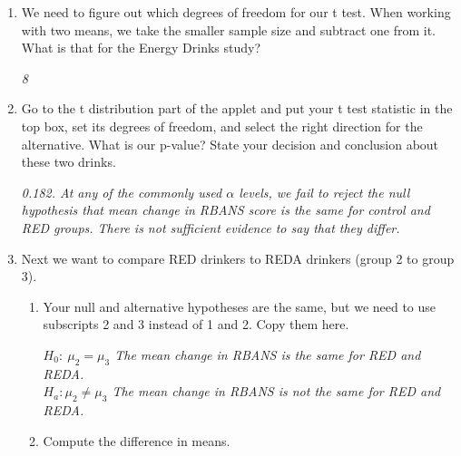 \begin{enumerate}
\item We need to figure out which degrees of freedom for our t
  test. When working with two means, we take the smaller sample size
  and subtract one from it. What is that for the Energy Drinks study?
\begin{students}
    \vspace{2.6cm}    
\end{students}

\begin{key}
  {\it  8}
\end{key}

 \item  Go to the t distribution part of the applet and put your t
   test statistic in the top box, 
   set its degrees of freedom, and select the right direction for the
   alternative.  What is our p-value?  State your decision and 
   conclusion about these two drinks. 
\begin{students}
    \vspace{5cm}    
\end{students}

\begin{key}
  {\it 0.182. At any of the commonly used $\alpha$ levels, we fail to
    reject the null hypothesis that mean change in RBANS score is the
    same for control and RED groups.  There is not sufficient evidence
    to say that they differ.}
\end{key}


 \item  Next we want to compare RED drinkers to REDA drinkers (group 2
   to group 3). 

   \begin{enumerate}
     \item Your null and alternative hypotheses are the same, but we
       need to use subscripts 2 and 3 instead of 1 and 2.  Copy them
       here. 
\begin{students}
    \vspace{2cm}    
\end{students}

\begin{key}
  {\it   $H_0:\ \mu_2 = \mu_3$ The mean change in RBANS is the same
    for RED and REDA.    \\ $H_a: \mu_2 \neq \mu_3$ The
    mean change in RBANS is not the same for RED and REDA.  }
\end{key}
 

      \item Compute the difference in means.
\begin{students}
    \vspace{1cm}    
\end{students}


\end{enumerate}
\end{enumerate}
